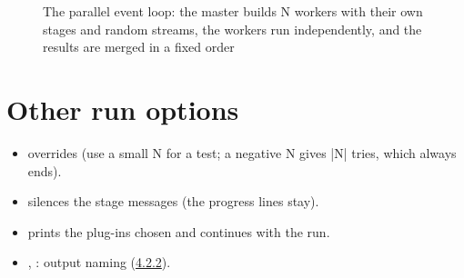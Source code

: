 \begin{figure}[htbp]
\caption[The parallel event loop]{The parallel event loop: the master builds N workers with their own stages and random streams, the workers run independently,\allowbreak{} and the results are merged in a fixed order}\label{fig:parallelu5fmode}
\end{figure}
\section{\texorpdfstring{Other run options}{Other run options}}\label{user_manual-08u5frunningu5fandu5freproducibility:86-other-run-options}
\begin{itemize}
\item {} overrides \hyperref[param:ngen]{} (use a small N for a test; a negative N gives |N| tries, which always ends).
\item {} silences the stage messages (the progress lines stay).
\item {} prints the plug-ins chosen and continues with the run.
\item {}, : output naming (\hyperref[user_manual-04u5finputs:422-run]{4.2.2}).
\end{itemize}
